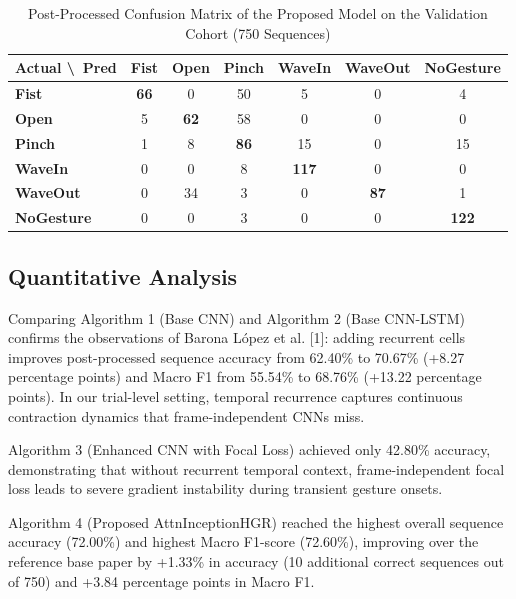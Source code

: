 \documentclass[conference]{IEEEtran}
\begin{document}
\begin{table}[h]
\centering
\caption{Post-Processed Confusion Matrix of the Proposed Model on the Validation Cohort (750 Sequences)}
\label{tab:cm}
\begin{tabular}{lcccccc}
\toprule
\textbf{Actual \textbackslash\ Pred} & \textbf{Fist} & \textbf{Open} & \textbf{Pinch} & \textbf{WaveIn} & \textbf{WaveOut} & \textbf{NoGesture} \\
\midrule
\textbf{Fist}      & \textbf{66} & 0           & 50          & 5           & 0           & 4           \\
\textbf{Open}      & 5           & \textbf{62} & 58          & 0           & 0           & 0           \\
\textbf{Pinch}     & 1           & 8           & \textbf{86} & 15          & 0           & 15          \\
\textbf{WaveIn}    & 0           & 0           & 8           & \textbf{117}& 0           & 0           \\
\textbf{WaveOut}   & 0           & 34          & 3           & 0           & \textbf{87} & 1           \\
\textbf{NoGesture} & 0           & 0           & 3           & 0           & 0           & \textbf{122}\\
\bottomrule
\end{tabular}
\end{table}

\subsection{Quantitative Analysis}
Comparing Algorithm 1 (Base CNN) and Algorithm 2 (Base CNN-LSTM) confirms the observations of Barona L{\'o}pez et al. [1]: adding recurrent cells improves post-processed sequence accuracy from 62.40\% to 70.67\% (+8.27 percentage points) and Macro F1 from 55.54\% to 68.76\% (+13.22 percentage points). In our trial-level setting, temporal recurrence captures continuous contraction dynamics that frame-independent CNNs miss.

Algorithm 3 (Enhanced CNN with Focal Loss) achieved only 42.80\% accuracy, demonstrating that without recurrent temporal context, frame-independent focal loss leads to severe gradient instability during transient gesture onsets.

Algorithm 4 (Proposed AttnInceptionHGR) reached the highest overall sequence accuracy (72.00\%) and highest Macro F1-score (72.60\%), improving over the reference base paper by +1.33\% in accuracy (10 additional correct sequences out of 750) and +3.84 percentage points in Macro F1.
\end{document}
